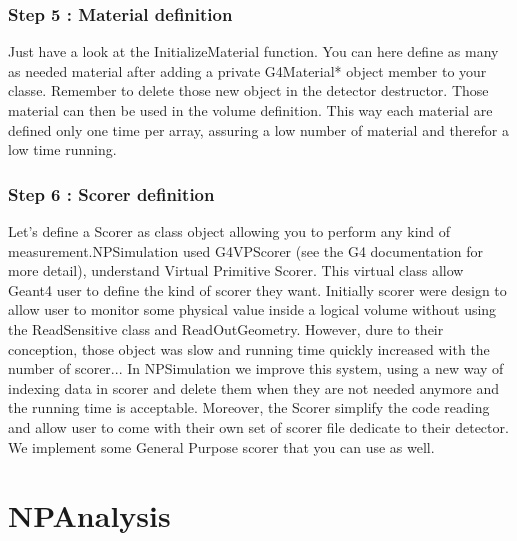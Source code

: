 \documentclass{book}
\begin{document}
		
		\subsection{Step 5 : Material definition}

		Just have a look at the InitializeMaterial function. 
		You can here define as many as needed material after adding a private G4Material* object member to your classe. 
		Remember to delete those new object in the detector destructor. Those material can then be used in the volume definition. 
		This way each material are defined only one time per array, assuring a low number of material and therefor a low time running.

		\subsection{Step 6 : Scorer definition}
	
	Let's define a Scorer as class object allowing you to perform any kind of measurement.NPSimulation used G4VPScorer (see the G4 documentation for more detail), understand Virtual Primitive Scorer. 
	This virtual class allow Geant4 user to define the kind of scorer they want. 
	Initially scorer were design to allow user to monitor some physical value inside a logical volume without using the ReadSensitive class and ReadOutGeometry. 
	However, dure to their conception, those object was slow and running time quickly increased with the number of scorer... 
	In NPSimulation we improve this system, using a new way of indexing data in scorer and delete them when they are not needed anymore and the running time is acceptable. 
	Moreover, the Scorer simplify the code reading and allow user to come with their own set of scorer file dedicate to their detector. 
	We implement some General Purpose scorer that you can use as well.

\chapter[NPAnalysis]{NPAnalysis}
\end{document}
